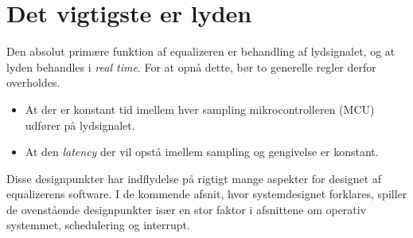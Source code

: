 \section{Det vigtigste er lyden}
Den absolut primære funktion af equalizeren er behandling af lydsignalet, og at lyden behandles i \textit{real time}.
For at opnå dette, bør to generelle regler derfor overholdes.
\begin{itemize}[noitemsep]
\item At der er konstant tid imellem hver sampling mikrocontrolleren (MCU) udfører på lydsignalet.
\item At den \textit{latency} der vil opstå imellem sampling og gengivelse er konstant.
\end{itemize}

Disse designpunkter har indflydelse på rigtigt mange aspekter for designet af equalizerens software.
I de kommende afsnit, hvor systemdesignet forklares, spiller de ovenstående designpunkter især en stor faktor i afsnittene om operativ systemmet, schedulering og interrupt.
